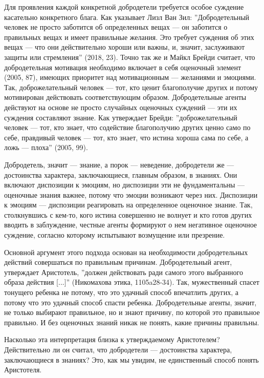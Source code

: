 \documentclass[11pt]{book}
\begin{document}
Для проявления каждой конкретной добродетели требуется особое суждение касательно конкретного блага. Как указывает Лизл Ван Зил: ''Добродетельный человек не просто заботится об определенных вещах --- он заботится о правильных вещах и имеет правильные желания. Это требует суждения об этих вещах --- что они действительно хороши или важны, и, значит, заслуживают защиты или стремления'' (2018, 23). Точно так же и Майкл Брейди считает, что добродетельная мотивация необходимо включает в себя оценочный элемент (2005, 87), имеющих приоритет над мотивационным --- желаниями и эмоциями. Так, доброжелательный человек --- тот, кто ценит благополучие других и потому мотивирован действовать соответствующим образом. Добродетельные агенты действуют на основе не просто случайных оценочных суждений --- эти их суждения составляют знание. Как утверждает Брейди: ''доброжелательный человек --- тот, кто знает, что содействие благополучию других ценно само по себе, правдивый человек --- тот, кто знает, что истина хороша сама по себе, а ложь --- плоха'' (2005, 99).

Добродетель, значит --- знание, а порок --- неведение, добродетели же --- достоинства характера, заключающиеся, главным образом, в знаниях. Они включают диспозиции к эмоциям, но диспозиции эти не фундаментальны --- оценочные знания важнее, потому что эмоции возникают через них. Диспозиции к эмоциям --- диспозиции реагировать на определенное оценочное знание. Так, столкнувшись с кем-то, кого истина совершенно не волнует и кто готов других вводить в заблуждение, честные агенты формируют о нем негативное оценочное суждение, согласно которому испытывают возмущение или презрение.

Основной аргумент этого подхода основан на необходимости добродетельных действий совершаться по правильным причинам. Добродетельный агент, утверждает Аристотель, ''должен действовать ради самого этого выбранного образа действия [...]'' (Никомахова этика, 1105a28-34). Так, мужественный спасет тонущего ребенка не потому, что это удачный способ впечатлить других, а потому что это удачный способ спасти ребенка. Добродетельные агенты, значит, не только выбирают правильное, но и знают причину, по которой это правильное правильно. И без оценочных знаний никак не понять, какие причины правильны.

Насколько эта интерпретация близка к утверждаемому Аристотелем? Действительно ли он считал, что добродетели --- достоинства характера, заключающиеся в знаниях? Это, как мы увидим, не единственный способ понять Аристотеля.
\end{document}
